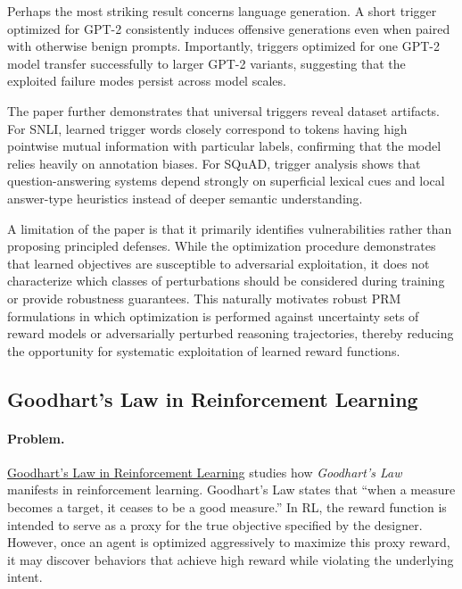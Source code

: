 \documentclass[11pt]{article}
\begin{document}
Perhaps the most striking result concerns language generation. A short trigger optimized for GPT-2 consistently induces offensive generations even when paired with otherwise benign prompts. Importantly, triggers optimized for one GPT-2 model transfer successfully to larger GPT-2 variants, suggesting that the exploited failure modes persist across model scales.

The paper further demonstrates that universal triggers reveal dataset artifacts. For SNLI, learned trigger words closely correspond to tokens having high pointwise mutual information with particular labels, confirming that the model relies heavily on annotation biases. For SQuAD, trigger analysis shows that question-answering systems depend strongly on superficial lexical cues and local answer-type heuristics instead of deeper semantic understanding.

A limitation of the paper is that it primarily identifies vulnerabilities rather than proposing principled defenses. While the optimization procedure demonstrates that learned objectives are susceptible to adversarial exploitation, it does not characterize which classes of perturbations should be considered during training or provide robustness guarantees. This naturally motivates robust PRM formulations in which optimization is performed against uncertainty sets of reward models or adversarially perturbed reasoning trajectories, thereby reducing the opportunity for systematic exploitation of learned reward functions.

\subsection{Goodhart's Law in Reinforcement Learning}

\paragraph{Problem.}

\href{https://arxiv.org/pdf/2310.09144}{Goodhart's Law in Reinforcement Learning}
 studies how \emph{Goodhart's Law} manifests in reinforcement learning. Goodhart's Law states that ``when a measure becomes a target, it ceases to be a good measure.'' In RL, the reward function is intended to serve as a proxy for the true objective specified by the designer. However, once an agent is optimized aggressively to maximize this proxy reward, it may discover behaviors that achieve high reward while violating the underlying intent.
\end{document}

